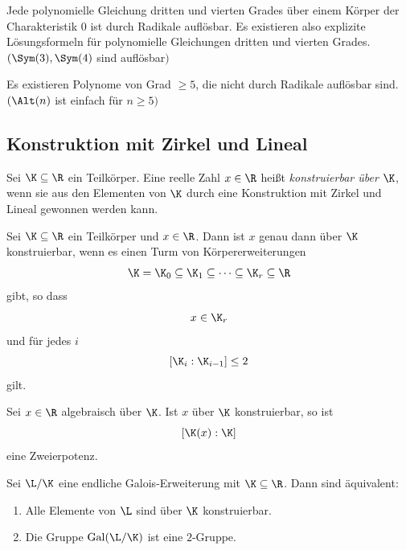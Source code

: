 \documentclass[11pt, a4paper]{article}
\begin{document}
\begin{corollary}
\Theorem
Jede polynomielle Gleichung dritten und vierten Grades über einem Körper der Charakteristik $0$ ist durch Radikale auflösbar. Es existieren also explizite Lösungsformeln für polynomielle Gleichungen dritten und vierten Grades. $(\Sym(3), \Sym (4)$ sind auflösbar$)$
\end{corollary}

\begin{corollary}
    Es existieren Polynome von Grad $\geq 5$, die nicht durch Radikale auflösbar sind. $(\Alt(n)$ ist einfach für $n\geq 5)$
\end{corollary}


\subsection{Konstruktion mit Zirkel und Lineal}


\begin{definition}
\Theorem
Sei $\K \subseteq \R$ ein Teilkörper. Eine reelle Zahl $x \in \R$ heißt \emph{konstruierbar über $\K$}, wenn sie aus den Elementen von $\K$ durch eine Konstruktion mit Zirkel und Lineal gewonnen werden kann.
\end{definition}

\begin{theorem}
\Theorem
Sei $\K \subseteq \R$ ein Teilkörper und $x \in \R$. Dann ist $x$ genau dann über $\K$ konstruierbar, wenn es einen Turm von Körpererweiterungen
$$
\K = \K_0 \subseteq \K_1 \subseteq \dots \subseteq \K_r \subseteq \R
$$
gibt, so dass
$$
x \in \K_r
$$
und für jedes $i$
$$
[\K_i : \K_{i-1}] \leq 2
$$
gilt.
\end{theorem}


\begin{corollary}

Sei $x \in \R$ algebraisch über $\K$. Ist $x$ über $\K$ konstruierbar, so ist
$$
[\K(x) : \K]
$$
eine Zweierpotenz.
\end{corollary}


\begin{lemma}

Sei $\L/\K$ eine endliche Galois-Erweiterung mit $\K \subseteq \R$. Dann sind äquivalent:
\begin{enumerate}[label=(\roman*)]
    \item Alle Elemente von $\L$ sind über $\K$ konstruierbar.
    \item Die Gruppe $\mathrm{Gal}(\L/\K)$ ist eine $2$-Gruppe.
\end{enumerate}
\end{lemma}
\end{document}
